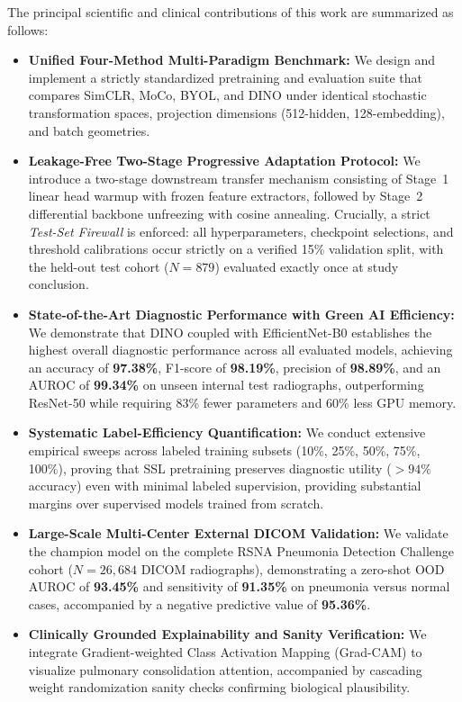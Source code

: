 \documentclass[journal,article,submit,moreauthors,pdftex]{Definitions/tsp}
\begin{document}
The principal scientific and clinical contributions of this work are summarized as follows:
\begin{itemize}
    \item \textbf{Unified Four-Method Multi-Paradigm Benchmark:} We design and implement a strictly standardized pretraining and evaluation suite that compares SimCLR, MoCo, BYOL, and DINO under identical stochastic transformation spaces, projection dimensions (512-hidden, 128-embedding), and batch geometries.
    \item \textbf{Leakage-Free Two-Stage Progressive Adaptation Protocol:} We introduce a two-stage downstream transfer mechanism consisting of Stage~1 linear head warmup with frozen feature extractors, followed by Stage~2 differential backbone unfreezing with cosine annealing. Crucially, a strict \emph{Test-Set Firewall} is enforced: all hyperparameters, checkpoint selections, and threshold calibrations occur strictly on a verified 15\% validation split, with the held-out test cohort ($N=879$) evaluated exactly once at study conclusion.
    \item \textbf{State-of-the-Art Diagnostic Performance with Green AI Efficiency:} We demonstrate that DINO coupled with EfficientNet-B0 establishes the highest overall diagnostic performance across all evaluated models, achieving an accuracy of \textbf{97.38\%}, F1-score of \textbf{98.19\%}, precision of \textbf{98.89\%}, and an AUROC of \textbf{99.34\%} on unseen internal test radiographs, outperforming ResNet-50 while requiring 83\% fewer parameters and 60\% less GPU memory.
    \item \textbf{Systematic Label-Efficiency Quantification:} We conduct extensive empirical sweeps across labeled training subsets (10\%, 25\%, 50\%, 75\%, 100\%), proving that SSL pretraining preserves diagnostic utility ($>94\%$ accuracy) even with minimal labeled supervision, providing substantial margins over supervised models trained from scratch.
    \item \textbf{Large-Scale Multi-Center External DICOM Validation:} We validate the champion model on the complete RSNA Pneumonia Detection Challenge cohort ($N=26,684$ DICOM radiographs), demonstrating a zero-shot OOD AUROC of \textbf{93.45\%} and sensitivity of \textbf{91.35\%} on pneumonia versus normal cases, accompanied by a negative predictive value of \textbf{95.36\%}.
    \item \textbf{Clinically Grounded Explainability and Sanity Verification:} We integrate Gradient-weighted Class Activation Mapping (Grad-CAM) to visualize pulmonary consolidation attention, accompanied by cascading weight randomization sanity checks confirming biological plausibility.
\end{itemize}
\end{document}
